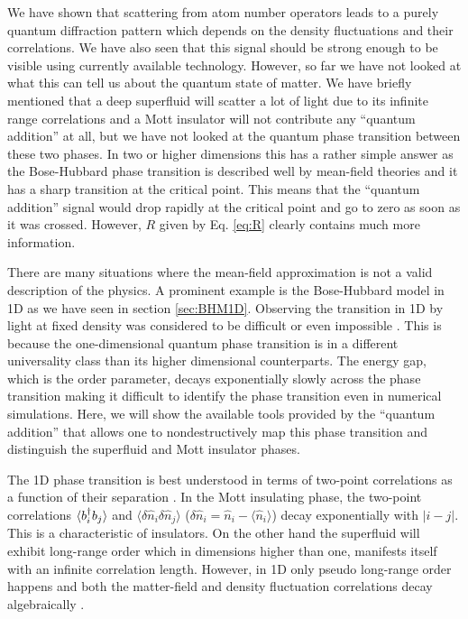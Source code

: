 We have shown that scattering from atom number operators leads to a
purely quantum diffraction pattern which depends on the density
fluctuations and their correlations. We have also seen that this
signal should be strong enough to be visible using currently available
technology. However, so far we have not looked at what this can tell
us about the quantum state of matter. We have briefly mentioned that a
deep superfluid will scatter a lot of light due to its infinite range
correlations and a Mott insulator will not contribute any ``quantum
addition'' at all, but we have not looked at the quantum phase
transition between these two phases. In two or higher dimensions this
has a rather simple answer as the Bose-Hubbard phase transition is
described well by mean-field theories and it has a sharp transition at
the critical point. This means that the ``quantum addition'' signal
would drop rapidly at the critical point and go to zero as soon as it
was crossed. However, $R$ given by Eq. \eqref{eq:R} clearly contains
much more information.

There are many situations where the mean-field approximation is not a
valid description of the physics. A prominent example is the
Bose-Hubbard model in 1D \cite{cazalilla2011, ejima2011, kuhner2000,
  pino2012, pino2013} as we have seen in section
\ref{sec:BHM1D}. Observing the transition in 1D by light at fixed
density was considered to be difficult \cite{rogers2014} or even
impossible \cite{roth2003}. This is because the one-dimensional
quantum phase transition is in a different universality class than its
higher dimensional counterparts. The energy gap, which is the order
parameter, decays exponentially slowly across the phase transition
making it difficult to identify the phase transition even in numerical
simulations. Here, we will show the available tools provided by the
``quantum addition'' that allows one to nondestructively map this
phase transition and distinguish the superfluid and Mott insulator
phases.

The 1D phase transition is best understood in terms of two-point
correlations as a function of their separation \cite{giamarchi}. In
the Mott insulating phase, the two-point correlations $\langle b^\dagger_i
b_j \rangle$ and $\langle \delta \hat{n}_i \delta \hat{n}_j \rangle$
($\delta \hat{n}_i =\hat{n}_i-\langle \hat{n}_i\rangle$) decay
exponentially with $|i-j|$. This is a characteristic of insulators. On
the other hand the superfluid will exhibit long-range order which in
dimensions higher than one, manifests itself with an infinite
correlation length. However, in 1D only pseudo long-range order
happens and both the matter-field and density fluctuation correlations
decay algebraically \cite{giamarchi}.

